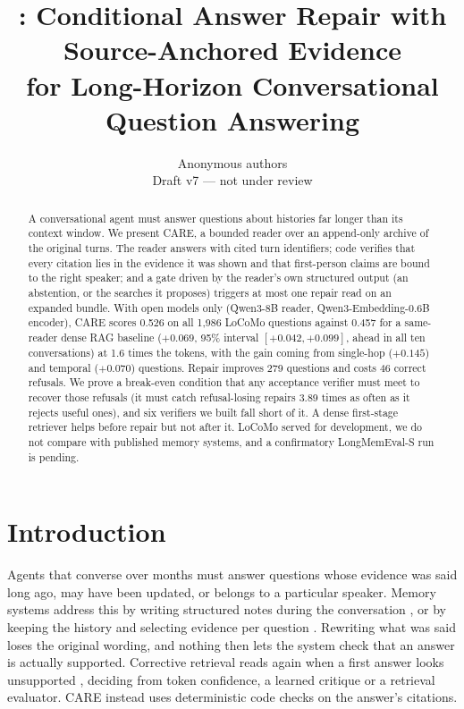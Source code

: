 \documentclass[10pt]{article}
\title{\textbf{\care{}: Conditional Answer Repair with Source-Anchored Evidence\\
for Long-Horizon Conversational Question Answering}}
\author{Anonymous authors\\ \small Draft v7 --- not under review}
\date{}
\theoremstyle{plain}
\newcommand{\care}{\textsc{CARE}}
\begin{document}
\maketitle

\begin{abstract}
A conversational agent must answer questions about histories far longer than its context window. We present
\care{}, a bounded reader over an append-only archive of the original turns. The reader answers with cited
turn identifiers; code verifies that every citation lies in the evidence it was shown and that first-person
claims are bound to the right speaker; and a gate driven by the reader's own structured output (an abstention,
or the searches it proposes) triggers at most one repair read on an expanded bundle. With open models only
(Qwen3-8B reader, Qwen3-Embedding-0.6B encoder), \care{} scores 0.526 on all 1,986 LoCoMo questions against 0.457
for a same-reader dense RAG baseline ($+0.069$, 95\% interval $[+0.042,+0.099]$, ahead in all ten
conversations) at 1.6 times the tokens, with the gain coming from single-hop ($+0.145$) and temporal ($+0.070$)
questions. Repair improves 279 questions and costs 46 correct refusals. We prove a break-even condition that any
acceptance verifier must meet to recover those refusals (it must catch refusal-losing repairs 3.89 times as often as it
rejects useful ones), and six verifiers we built fall short of it. A dense first-stage retriever helps before repair
but not after it. LoCoMo served for development, we do not compare with published memory systems, and a confirmatory
LongMemEval-S run is pending.
\end{abstract}

\section{Introduction}
\label{sec:intro}

Agents that converse over months must answer questions whose evidence was said long ago, may have
been updated, or belongs to a particular speaker. Memory systems address this by writing structured notes
during the conversation \citep{packer2023memgpt,chhikara2025mem0,amem2025,memoryr12025,cao2026higmem}, or by
keeping the history and selecting evidence per question \citep{du2026memr3,wang2026cuemem,liu2026livectx,chen2026justmem,yu2026lazymem}.
Rewriting what was said loses the original wording, and nothing then lets the system check that an answer is
actually supported. Corrective retrieval reads again when a first answer looks unsupported
\citep{jiang2023active,asai2023selfrag,yan2024crag}, deciding from token confidence, a learned critique or a retrieval
evaluator. \care{} instead uses deterministic code checks on the answer's citations.
\end{document}
